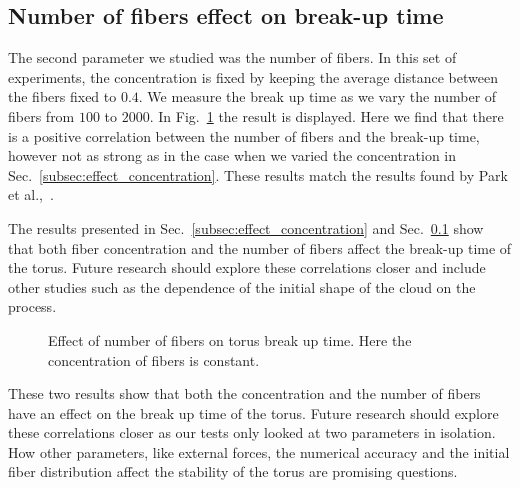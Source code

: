 \subsection{Number of fibers effect on break-up time}
\label{subsec:effect_number}

The second parameter we studied was the number of fibers. In this set of experiments, the concentration is fixed by keeping the average distance between the fibers fixed to $0.4$. We measure the break up time as we vary the number of fibers from $100$ to $2000$. In Fig.~\ref{fig:number_breakup} the result is displayed. Here we find that there is a positive correlation between the number of fibers and the break-up time, however not as strong as in the case when we varied the concentration in Sec.~\ref{subsec:effect_concentration}. These results match the results found by Park et al.,~\cite{Park2010}.

The results presented in Sec.~\ref{subsec:effect_concentration} and Sec.~\ref{subsec:effect_number} show that both fiber concentration and the number of fibers affect the break-up time of the torus. Future research should explore these correlations closer and include other studies such as the dependence of the initial shape of the cloud on the process.

\begin{figure}[!htbp]
  \centering
  \caption[Effect of number of fibers on torus break up time.]{Effect of number of fibers on torus break up time. Here the concentration of fibers is constant.}
  \label{fig:number_breakup}
\end{figure}

These two results show that both the concentration and the number of fibers have an effect on the break up time of the torus. Future research should explore these correlations closer as our tests only looked at two parameters in isolation. How other parameters, like external forces, the numerical accuracy and the initial fiber distribution affect the stability of the torus are promising questions.

